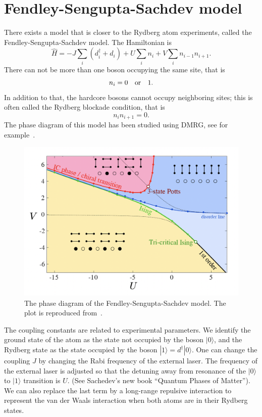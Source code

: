 \documentclass[prb,twocolumn,11pt]{revtex4-1}
\begin{document}
\section{Fendley-Sengupta-Sachdev model}
There exists a model that is closer to the Rydberg atom experiments, called the Fendley-Sengupta-Sachdev model. The Hamiltonian is 
\begin{equation}
    \hat{H}=-J \sum_i (d_i^{\dagger}+d_i)+ U \sum_i n_i + V \sum_i n_{i-1}n_{i+1}.
\end{equation}
There can not be more than one boson occupying the same site, that is 
\begin{equation}
    n_i=0\quad {\rm or} \quad 1.
\end{equation}
In addition to that, the hardcore bosons cannot occupy neighboring sites; this is often called the Rydberg blockade condition, that is 
\begin{equation}
    n_i n_{i+1}=0.
\end{equation}
The phase diagram of this model has been studied using DMRG, see for example~\cite{10.21468/SciPostPhys.6.3.033}.
\begin{figure}[htbp]
\centering
\includegraphics[scale=0.4]{phase_diagram.png}
\caption{The phase diagram of the Fendley-Sengupta-Sachdev model. The plot is reproduced from~\cite{10.21468/SciPostPhys.6.3.033}. }
\label{phasediagram}
\end{figure}
The coupling constants are related to experimental parameters. We identify the ground state of the atom as the state not occupied by the boson $|0\rangle$, and the Rydberg state as the state occupied by the boson $|1\rangle=d^{\dagger}|0\rangle$. 
One can change the coupling $J$ by changing the Rabi frequency of the external laser.
The frequency of the external laser is adjusted so that the detuning away from resonance of the $|0\rangle$ to $|1\rangle$ transition is $U$. 
(See Sachedev's new book ``Quantum Phases of Matter''). We can also replace the last term by a long-range repulsive interaction to represent the van der Waals interaction
when both atoms are in their Rydberg states.
\end{document}
